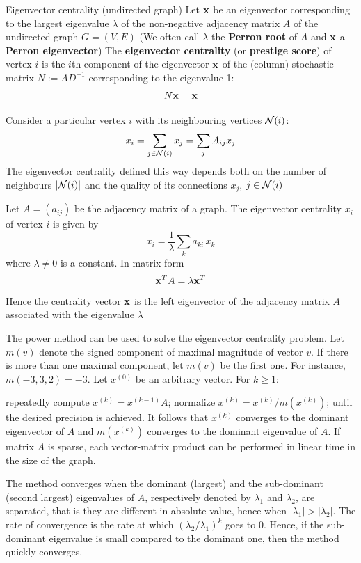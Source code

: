 \documentclass[aspectratio=169]{beamer}
\begin{document}
\begin{frame}{Eigenvector centrality (undirected graph)}
Let $\mathbf{x}$ be an eigenvector corresponding to the largest eigenvalue $\lambda$ of the non-negative adjacency matrix $A$ of the undirected graph $G = (V, E)$
\vfill
(We often call $\lambda$ the \textbf{Perron root} of $A$ and $\mathbf{x}$ a \textbf{Perron eigenvector})
\vfill
The \textbf{eigenvector centrality} (or \textbf{prestige score}) of vertex $i$ is the $i$th component of the eigenvector $\mathbf{x}$ of the (column) stochastic matrix $N := AD^{-1}$ corresponding to the eigenvalue 1:
\[
	N\mathbf{x} = \mathbf{x}
\]
\end{frame}

\begin{frame}
Consider a particular vertex $i$ with its neighbouring vertices $\mathcal{N}(i)$:
\[
	x_i = \sum_{j\in\mathcal{N}(i)} x_j 
	= \sum_j A_{ij} x_j	
\]
\vfill
The eigenvector centrality defined this way depends both on the number of neighbours $|\mathcal{N}(i)|$ and the quality of its connections $x_j$, $j\in\mathcal{N}(i)$
\end{frame}

\begin{frame}
	Let $A = (a_{ij})$ be the adjacency matrix of a graph. The eigenvector centrality $x_{i}$ of vertex $i$ is given by
	$$
	x_i = \frac{1}{\lambda} \sum_k a_{ki} \, x_k
	$$ 
	where $\lambda \neq 0$ is a constant. In matrix form
	$$
	\mathbf{x}^T A=\lambda\mathbf{x}^T
	$$
\vfill
Hence the centrality vector $\mathbf{x}$ is the left eigenvector of the adjacency matrix $A$ associated with the eigenvalue $\lambda$
\end{frame}


\begin{frame} 
The power method can be used to solve the eigenvector centrality problem. Let $m(v)$ denote the signed component of maximal magnitude of vector $v$. If there is more than one maximal component, let $m(v)$ be the first one. For instance, $m(-3,3,2) = -3$. Let $x^{(0)}$ be an arbitrary vector. For $k \geq 1$:

repeatedly compute $x^{(k)} = x^{(k-1)} A$;
normalize $x^{(k)} = x^{(k)} / m(x^{(k)})$;
until the desired precision is achieved. It follows that $x^{(k)}$ converges to the dominant eigenvector of $A$ and $m(x^{(k)})$ converges to the dominant eigenvalue of $A$. If matrix $A$ is sparse, each vector-matrix product can be performed in linear time in the size of the graph.
\end{frame}


\begin{frame}
The method converges when the dominant (largest) and the sub-dominant (second largest) eigenvalues of $A$, respectively denoted by $\lambda_1$ and $\lambda_2$, are separated, that is they are different in absolute value, hence when $|\lambda_1| > |\lambda_2|$. The rate of convergence is the rate at which $(\lambda_2 / \lambda_1)^k$ goes to $0$. Hence, if the sub-dominant eigenvalue is small compared to the dominant one, then the method quickly converges.
\end{frame}
\end{document}

